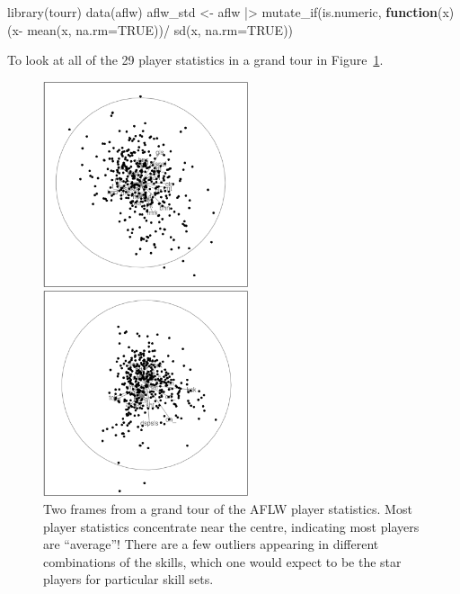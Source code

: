 \documentclass[
  letterpaper,
]{krantz}
\newenvironment{Shaded}{\begin{snugshade}}{\end{snugshade}}
\newcommand{\AttributeTok}[1]{\textcolor[rgb]{0.40,0.45,0.13}{#1}}
\newcommand{\ConstantTok}[1]{\textcolor[rgb]{0.56,0.35,0.01}{#1}}
\newcommand{\ControlFlowTok}[1]{\textcolor[rgb]{0.00,0.23,0.31}{\textbf{#1}}}
\newcommand{\FunctionTok}[1]{\textcolor[rgb]{0.28,0.35,0.67}{#1}}
\newcommand{\NormalTok}[1]{\textcolor[rgb]{0.00,0.23,0.31}{#1}}
\newcommand{\OtherTok}[1]{\textcolor[rgb]{0.00,0.23,0.31}{#1}}
\newcommand{\SpecialCharTok}[1]{\textcolor[rgb]{0.37,0.37,0.37}{#1}}
\begin{document}
\begin{Shaded}
\begin{Highlighting}[]
\FunctionTok{library}\NormalTok{(tourr)}
\FunctionTok{data}\NormalTok{(aflw)}
\NormalTok{aflw\_std }\OtherTok{\textless{}{-}}\NormalTok{ aflw }\SpecialCharTok{|\textgreater{}}
  \FunctionTok{mutate\_if}\NormalTok{(is.numeric, }\ControlFlowTok{function}\NormalTok{(x) (x}\SpecialCharTok{{-}}
      \FunctionTok{mean}\NormalTok{(x, }\AttributeTok{na.rm=}\ConstantTok{TRUE}\NormalTok{))}\SpecialCharTok{/}
      \FunctionTok{sd}\NormalTok{(x, }\AttributeTok{na.rm=}\ConstantTok{TRUE}\NormalTok{))}
\end{Highlighting}
\end{Shaded}

To look at all of the 29 player statistics in a grand tour in
Figure~\ref{fig-aflw-gt-pdf}.

\begin{figure}

\begin{minipage}{0.50\linewidth}
\includegraphics[width=2.375in,height=\textheight,keepaspectratio]{images/aflw_gt_70.png}\end{minipage}%
%
\begin{minipage}{0.50\linewidth}
\includegraphics[width=2.375in,height=\textheight,keepaspectratio]{images/aflw_gt_329.png}\end{minipage}%

\caption{\label{fig-aflw-gt-pdf}Two frames from a grand tour of the AFLW
player statistics. Most player statistics concentrate near the centre,
indicating most players are ``average''! There are a few outliers
appearing in different combinations of the skills, which one would
expect to be the star players for particular skill sets.
}

\end{figure}%
\end{document}
